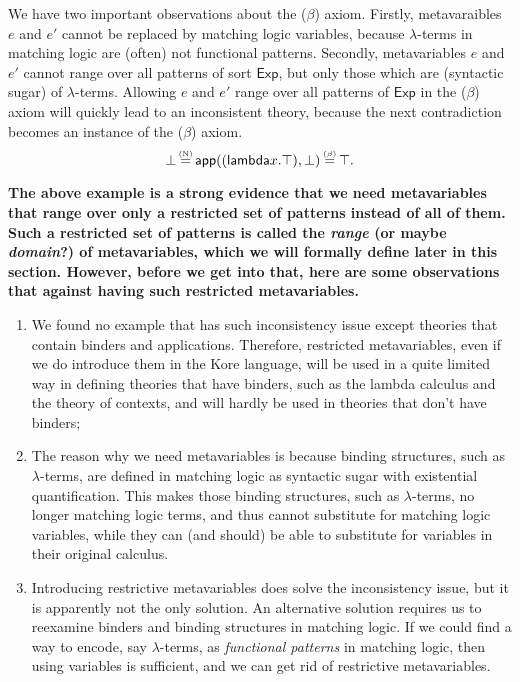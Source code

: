\documentclass{article}
\newcommand{\comment}[1]
    {\par {\bfseries \color{blue} #1 \par}} %
\theoremstyle{plain}
\theoremstyle{definition}
\theoremstyle{remark}
\newcommand\xeq[1]
    {\stackrel{\mathclap{\normalfont\tiny\mbox{#1}}}{=}}
\begin{document}
We have two important observations about the ($\beta$) axiom. Firstly, metavaraibles $e$ and $e'$ cannot be replaced by matching logic variables, because $\lambda$-terms in matching logic are (often) not functional patterns. Secondly, metavariables $e$ and $e'$ cannot range over all patterns of sort $\mathsf{Exp}$, but only those which are (syntactic sugar) of $\lambda$-terms. Allowing $e$ and $e'$ range over all patterns of $\mathsf{Exp}$ in the ($\beta$) axiom will quickly lead to an inconsistent theory, because the next contradiction becomes an instance of the ($\beta$) axiom.
\begin{equation*}
\bot 
\xeq{(N)} \mathsf{app}((\mathsf{lambda} x . \top), \bot)
\xeq{($\beta$)} \top.
\end{equation*}

\comment{The above example is a strong evidence that we need metavariables that range over only a restricted set of patterns instead of all of them. Such a restricted set of patterns is called the \emph{range} (or maybe \emph{domain}?) of metavariables, which we will formally define later in this section. However, before we get into that, here are some observations that against having such restricted metavariables.
\begin{enumerate}
\item We found no example that has such inconsistency issue except theories that contain binders and applications. Therefore, restricted metavariables, even if we do introduce them in the Kore language, will be used in a quite limited way in defining theories that have binders, such as the lambda calculus and the theory of contexts, and will hardly be used in theories that don't have binders;
\item The reason why we need metavariables is because binding structures, such as $\lambda$-terms, are defined in matching logic as syntactic sugar with existential quantification. This makes those binding structures, such as $\lambda$-terms, no longer matching logic terms, and thus cannot substitute for matching logic variables, while they can (and should) be able to substitute for variables in their original calculus.
\item Introducing restrictive metavariables does solve the inconsistency issue, but it is apparently not the only solution. An alternative solution requires us to reexamine binders and binding structures in matching logic. If we could find a way to encode, say $\lambda$-terms, as \emph{functional patterns} in matching logic, then using variables is sufficient, and we can get rid of restrictive metavariables.

\end{enumerate}}
\end{document}
